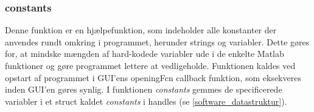 \newpage
\subsubsection{constants}
Denne funktion er en hjælpefunktion, som indeholder alle konstanter der anvendes rundt omkring i programmet, herunder strings og variabler. Dette gøres for, at mindske mængden af hard-kodede variabler ude i de enkelte Matlab funktioner og gøre programmet lettere at vedligeholde. Funktionen kaldes ved opstart af programmet i GUI'ens openingFcn callback funktion, som eksekveres inden GUI'en gøres synlig. I funktionen \textit{constants} gemmes de specificerede variabler i et struct kaldet \textit{constants} i handles (se \ref{software_datastruktur}). 
